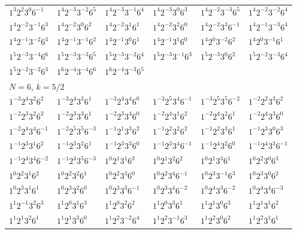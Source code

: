 \documentclass[12pt]{amsart}
\numberwithin{equation}{section}
\theoremstyle{plain}
\theoremstyle{definition}
\theoremstyle{remark}
\begin{document}
\begin{longtable}{llllll}
$1^{3}2^{2}3^{0}6^{-1}$ & $1^{4}2^{-3}3^{-2}6^{5}$ & $1^{4}2^{-3}3^{-1}6^{4}$ & $1^{4}2^{-3}3^{0}6^{3}$ & $1^{4}2^{-2}3^{-3}6^{5}$ & $1^{4}2^{-2}3^{-2}6^{4}$\\
$1^{4}2^{-2}3^{-1}6^{3}$ & $1^{4}2^{-2}3^{0}6^{2}$ & $1^{4}2^{-2}3^{1}6^{1}$ & $1^{4}2^{-2}3^{2}6^{0}$ & $1^{4}2^{-2}3^{3}6^{-1}$ & $1^{4}2^{-1}3^{-3}6^{4}$\\
$1^{4}2^{-1}3^{-2}6^{3}$ & $1^{4}2^{-1}3^{-1}6^{2}$ & $1^{4}2^{-1}3^{0}6^{1}$ & $1^{4}2^{-1}3^{1}6^{0}$ & $1^{4}2^{0}3^{-2}6^{2}$ & $1^{4}2^{0}3^{-1}6^{1}$\\
$1^{5}2^{-3}3^{-4}6^{6}$ & $1^{5}2^{-3}3^{-3}6^{5}$ & $1^{5}2^{-3}3^{-2}6^{4}$ & $1^{5}2^{-3}3^{-1}6^{3}$ & $1^{5}2^{-3}3^{0}6^{2}$ & $1^{5}2^{-2}3^{-3}6^{4}$\\
$1^{5}2^{-2}3^{-2}6^{3}$ & $1^{6}2^{-4}3^{-4}6^{6}$ & $1^{6}2^{-4}3^{-3}6^{5}$ & &&\\
\midrule
\multicolumn{6}{l}{$N=6$, $k=5/2$}\\
$1^{-3}2^{4}3^{2}6^{2}$ & $1^{-3}2^{4}3^{3}6^{1}$ & $1^{-3}2^{4}3^{4}6^{0}$ & $1^{-3}2^{5}3^{4}6^{-1}$ & $1^{-3}2^{5}3^{5}6^{-2}$ & $1^{-2}2^{2}3^{3}6^{2}$\\
$1^{-2}2^{3}3^{2}6^{2}$ & $1^{-2}2^{3}3^{3}6^{1}$ & $1^{-2}2^{3}3^{4}6^{0}$ & $1^{-2}2^{4}3^{1}6^{2}$ & $1^{-2}2^{4}3^{2}6^{1}$ & $1^{-2}2^{4}3^{3}6^{0}$\\
$1^{-2}2^{4}3^{4}6^{-1}$ & $1^{-2}2^{5}3^{5}6^{-3}$ & $1^{-1}2^{1}3^{3}6^{2}$ & $1^{-1}2^{2}3^{2}6^{2}$ & $1^{-1}2^{2}3^{3}6^{1}$ & $1^{-1}2^{3}3^{0}6^{3}$\\
$1^{-1}2^{3}3^{1}6^{2}$ & $1^{-1}2^{3}3^{2}6^{1}$ & $1^{-1}2^{3}3^{3}6^{0}$ & $1^{-1}2^{3}3^{4}6^{-1}$ & $1^{-1}2^{4}3^{2}6^{0}$ & $1^{-1}2^{4}3^{3}6^{-1}$\\
$1^{-1}2^{4}3^{4}6^{-2}$ & $1^{-1}2^{4}3^{5}6^{-3}$ & $1^{0}2^{1}3^{1}6^{3}$ & $1^{0}2^{1}3^{2}6^{2}$ & $1^{0}2^{1}3^{3}6^{1}$ & $1^{0}2^{2}3^{0}6^{3}$\\
$1^{0}2^{2}3^{1}6^{2}$ & $1^{0}2^{2}3^{2}6^{1}$ & $1^{0}2^{2}3^{3}6^{0}$ & $1^{0}2^{2}3^{4}6^{-1}$ & $1^{0}2^{3}3^{-1}6^{3}$ & $1^{0}2^{3}3^{0}6^{2}$\\
$1^{0}2^{3}3^{1}6^{1}$ & $1^{0}2^{3}3^{2}6^{0}$ & $1^{0}2^{3}3^{3}6^{-1}$ & $1^{0}2^{3}3^{4}6^{-2}$ & $1^{0}2^{4}3^{3}6^{-2}$ & $1^{0}2^{4}3^{4}6^{-3}$\\
$1^{1}2^{-1}3^{2}6^{3}$ & $1^{1}2^{0}3^{1}6^{3}$ & $1^{1}2^{0}3^{2}6^{2}$ & $1^{1}2^{0}3^{3}6^{1}$ & $1^{1}2^{1}3^{0}6^{3}$ & $1^{1}2^{1}3^{1}6^{2}$\\
$1^{1}2^{1}3^{2}6^{1}$ & $1^{1}2^{1}3^{3}6^{0}$ & $1^{1}2^{2}3^{-2}6^{4}$ & $1^{1}2^{2}3^{-1}6^{3}$ & $1^{1}2^{2}3^{0}6^{2}$ & $1^{1}2^{2}3^{1}6^{1}$\\

\end{longtable}
\end{document}
